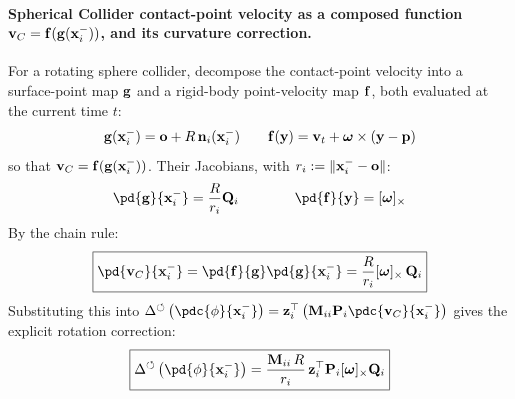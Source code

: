 \begin{derivation}
\paragraph{Spherical Collider contact-point velocity as a composed function $\mathbf{v}_C = \mathbf{f}(\mathbf{g}(\mathbf{x}_i^-))$, and its curvature correction.} \mbox{}\par\medskip
For a rotating sphere collider, decompose the contact-point velocity into a surface-point map $\mathbf{g}$
and a rigid-body point-velocity map $\mathbf{f}$, both evaluated at the current time $t$:
\begin{equation*}
    \mathbf{g}(\mathbf{x}_i^-) = \mathbf{o} + R\,\mathbf{n}_i(\mathbf{x}_i^-) 
    \quad\quad 
    \mathbf{f}(\mathbf{y}) = \mathbf{v}_t + \boldsymbol\omega \times (\mathbf{y} - \mathbf{p})
\end{equation*}
so that $\mathbf{v}_C = \mathbf{f}(\mathbf{g}(\mathbf{x}_i^-))$. Their Jacobians, with $r_i := \lVert\mathbf{x}_i^- - \mathbf{o}\rVert$:
\begin{equation*}
    \pd{\g}{\x_i^-} = \frac{R}{r_i}\mathbf{Q}_i
    \qquad\qquad
    \pd{\f}{\mathbf{y}} = [\boldsymbol\omega]_\times
\end{equation*}
By the chain rule:
\begin{equation}
    \boxed{
    \pd{\vv_C}{\x_i^-} = \pd{\f}{\g}\pd{\g}{\x_i^-} = \frac{R}{r_i}[\boldsymbol\omega]_\times\,\mathbf{Q}_i
    }
\end{equation}
Substituting this into $\Delta^\circlearrowleft\left(\pdc{\phi}{\x_i^-}\right) = \z_i^\top\left(\M_{ii}\mathbf{P}_i\pdc{\vv_C}{\x_i^-}\right)$ gives the explicit rotation correction:
\begin{equation}
    \boxed{
    \Delta^\circlearrowleft\left(\pd{\phi}{\x_i^-}\right) = \frac{\M_{ii}\,R}{r_i}\,\z_i^\top\mathbf{P}_i[\boldsymbol\omega]_\times\mathbf{Q}_i
    }
\end{equation}
\end{derivation}

